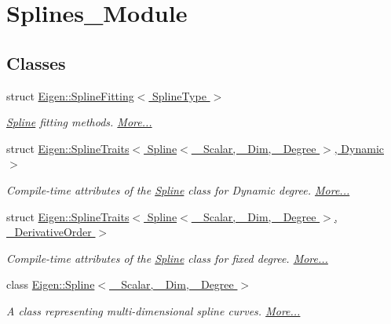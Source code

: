 \hypertarget{group___splines___module}{}\section{Splines\+\_\+\+Module}
\label{group___splines___module}
\subsection*{Classes}
\begin{DoxyCompactItemize}
\item 
struct \hyperlink{group___splines___module_struct_eigen_1_1_spline_fitting}{Eigen\+::\+Spline\+Fitting$<$ Spline\+Type $>$}
\begin{DoxyCompactList}\small\item\em \hyperlink{group___splines___module_class_eigen_1_1_spline}{Spline} fitting methods.  \hyperlink{group___splines___module_struct_eigen_1_1_spline_fitting}{More...}\end{DoxyCompactList}\item 
struct \hyperlink{group___splines___module_struct_eigen_1_1_spline_traits_3_01_spline_3_01___scalar_00_01___dim_00_01___degree_01_4_00_01_dynamic_01_4}{Eigen\+::\+Spline\+Traits$<$ Spline$<$ \+\_\+\+Scalar, \+\_\+\+Dim, \+\_\+\+Degree $>$, Dynamic $>$}
\begin{DoxyCompactList}\small\item\em Compile-\/time attributes of the \hyperlink{group___splines___module_class_eigen_1_1_spline}{Spline} class for Dynamic degree.  \hyperlink{group___splines___module_struct_eigen_1_1_spline_traits_3_01_spline_3_01___scalar_00_01___dim_00_01___degree_01_4_00_01_dynamic_01_4}{More...}\end{DoxyCompactList}\item 
struct \hyperlink{group___splines___module_struct_eigen_1_1_spline_traits_3_01_spline_3_01___scalar_00_01___dim_00_01___degree_01_4_00_01___derivative_order_01_4}{Eigen\+::\+Spline\+Traits$<$ Spline$<$ \+\_\+\+Scalar, \+\_\+\+Dim, \+\_\+\+Degree $>$, \+\_\+\+Derivative\+Order $>$}
\begin{DoxyCompactList}\small\item\em Compile-\/time attributes of the \hyperlink{group___splines___module_class_eigen_1_1_spline}{Spline} class for fixed degree.  \hyperlink{group___splines___module_struct_eigen_1_1_spline_traits_3_01_spline_3_01___scalar_00_01___dim_00_01___degree_01_4_00_01___derivative_order_01_4}{More...}\end{DoxyCompactList}\item 
class \hyperlink{group___splines___module_class_eigen_1_1_spline}{Eigen\+::\+Spline$<$ \+\_\+\+Scalar, \+\_\+\+Dim, \+\_\+\+Degree $>$}
\begin{DoxyCompactList}\small\item\em A class representing multi-\/dimensional spline curves.  \hyperlink{group___splines___module_class_eigen_1_1_spline}{More...}\end{DoxyCompactList}\end{DoxyCompactItemize}
